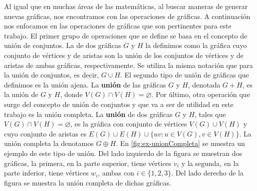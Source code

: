 Al igual que en muchas \'areas de las matem\'aticas, al buscar maneras de
generar nuevas gr\'aficas, nos encontramos con las operaciones de gr\'aficas. A
continuaci\'on nos enfocamos en las operaciones de gr\'aficas que son
pertinentes para este trabajo. El primer grupo de operaciones que se define se
basa en el concepto de uni\'on de conjuntos. La  de dos
gr\'aficas $G$ y $H$ la definimos como la gr\'afica cuyo conjunto de v\'ertices
y de aristas son la uni\'on de los conjuntos de v\'ertices  y de aristas de
ambas gr\'aficas, respectivamente. Se utiliza la misma notaci\'on que para la
uni\'on de conjuntos, es decir, $G \cup H$. El segundo tipo de uni\'on de
gr\'aficas que definimos es la uni\'on ajena. La \textbf{uni\'on}
 de las gr\'aficas $G$ y $H$, denotada $G + H$, es la
uni\'on de $G$ y $H$, donde $V(G) \cap V(H) = \varnothing$. Por \'ultimo, otra
operaci\'on que surge del concepto de uni\'on de conjuntos y que va a ser de
utilidad en este trabajo es la uni\'on completa. La \textbf{uni\'on}
 de dos gr\'aficas $G$ y $H$, tales que $V(G) \cap
V(H)=\varnothing$, es la gr\'afica con conjunto de v\'ertices $V(G) \cup V(H)$ y
cuyo conjunto de aristas es $E(G) \cup E(H) \cup \{uv \colon u \in V(G), v \in
V(H) \}$. La uni\'on completa la denotamos $G \oplus H$. En
\cref{fig:ex-unionCompleta} se muestra un ejemplo de este tipo de uni\'on. Del
lado izquierdo de la figura se muestran dos gr\'aficas, la primera, en la parte
superior, tiene v\'ertices $v_i$ y la segunda, en la parte inferior, tiene
v\'ertices $w_i$, ambas con $i \in \{1, 2 ,3\}$. Del lado derecho de la figura
se muestra la uni\'on completa de dichas gr\'aficas.

